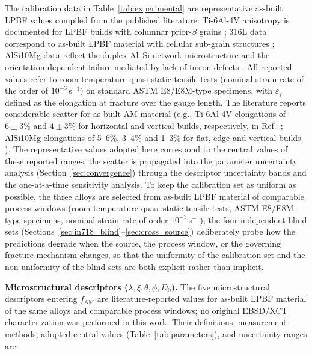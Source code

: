 \documentclass[12pt,a4paper,twocolumn]{article}
\begin{document}
The calibration data in Table~\ref{tab:experimental} are representative as-built LPBF values compiled from the published literature: Ti-6Al-4V anisotropy is documented for LPBF builds with columnar prior-$\beta$ grains \cite{carroll2015anisotropic,wang2024metals_ti64}; 316L data correspond to as-built LPBF material with cellular sub-grain structures \cite{jaskari2021materials_316l}; AlSi10Mg data reflect the duplex Al--Si network microstructure and the orientation-dependent failure mediated by lack-of-fusion defects \cite{wu2023sci_alsi}. All reported values refer to room-temperature quasi-static tensile tests (nominal strain rate of the order of $10^{-3}$\,s$^{-1}$) on standard ASTM E8/E8M-type specimens, with $\varepsilon_f$ defined as the elongation at fracture over the gauge length. The literature reports considerable scatter for as-built AM material (e.g., Ti-6Al-4V elongations of $6\pm3\%$ and $4\pm3\%$ for horizontal and vertical builds, respectively, in Ref.~\cite{wang2024metals_ti64}; AlSi10Mg elongations of 5--6\%, 3--4\% and 1--3\% for flat, edge and vertical builds \cite{wu2023sci_alsi}). The representative values adopted here correspond to the central values of these reported ranges; the scatter is propagated into the parameter uncertainty analysis (Section~\ref{sec:convergence}) through the descriptor uncertainty bands and the one-at-a-time sensitivity analysis. To keep the calibration set as uniform as possible, the three alloys are selected from as-built LPBF material of comparable process windows (room-temperature quasi-static tensile tests, ASTM E8/E8M-type specimens, nominal strain rate of order $10^{-3}$\,s$^{-1}$); the four independent blind sets (Sections~\ref{sec:in718_blind}--\ref{sec:cross_source}) deliberately probe how the predictions degrade when the source, the process window, or the governing fracture mechanism changes, so that the uniformity of the calibration set and the non-uniformity of the blind sets are both explicit rather than implicit.

\textbf{Microstructural descriptors ($\lambda, \xi, \theta, \phi, D_0$).} The five microstructural descriptors entering $f_{\mathrm{AM}}$ are literature-reported values for as-built LPBF material of the same alloys and comparable process windows; no original EBSD/XCT characterization was performed in this work. Their definitions, measurement methods, adopted central values (Table~\ref{tab:parameters}), and uncertainty ranges are:
\end{document}
